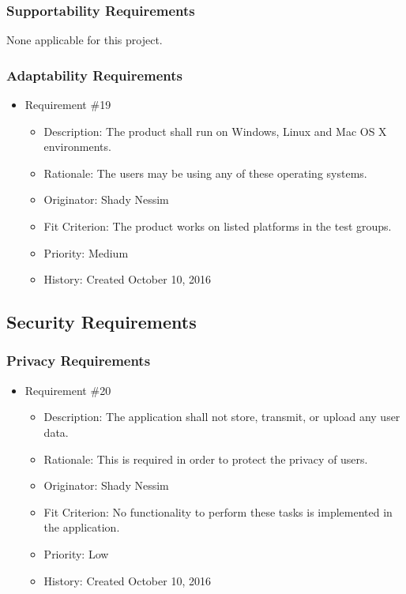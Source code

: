 \documentclass[12pt, titlepage]{article}
\begin{document}
\subsubsection{Supportability Requirements}
None applicable for this project.

\subsubsection{Adaptability Requirements}
\begin{itemize} 

\item Requirement \#19
\begin{itemize} 
\item Description: The product shall run on Windows, Linux and Mac OS X environments.
\item Rationale: The users may be using any of these operating systems.
\item Originator: Shady Nessim 
\item Fit Criterion: The product works on listed platforms in the test groups.
\item Priority: Medium 
\item History: Created October 10, 2016
\end{itemize}

\end{itemize}

\subsection{Security Requirements}
\subsubsection{Privacy Requirements}
\begin{itemize} 

\item Requirement \#20
\begin{itemize} 
\item Description: The application shall not store, transmit, or upload any user data.
\item Rationale: This is required in order to protect the privacy of users.
\item Originator: Shady Nessim
\item Fit Criterion: No functionality to perform these tasks is implemented in the application. 
\item Priority: Low 
\item History: Created October 10, 2016
\end{itemize}

\end{itemize}
\end{document}
